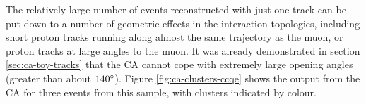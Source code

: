 The relatively large number of events reconstructed with just one track can be put down to a number of geometric effects in the interaction topologies, including short proton tracks running along almost the same trajectory as the muon, or proton tracks at large angles to the muon. It was already demonstrated in section \ref{sec:ca-toy-tracks} that the \ac{CA} cannot cope with extremely large opening angles (greater than about $140^\circ$). Figure \ref{fig:ca-clusters-ccqe} shows the output from the CA for three events from this sample, with clusters indicated by colour.

\begin{figure}
    \centering
\end{figure}
